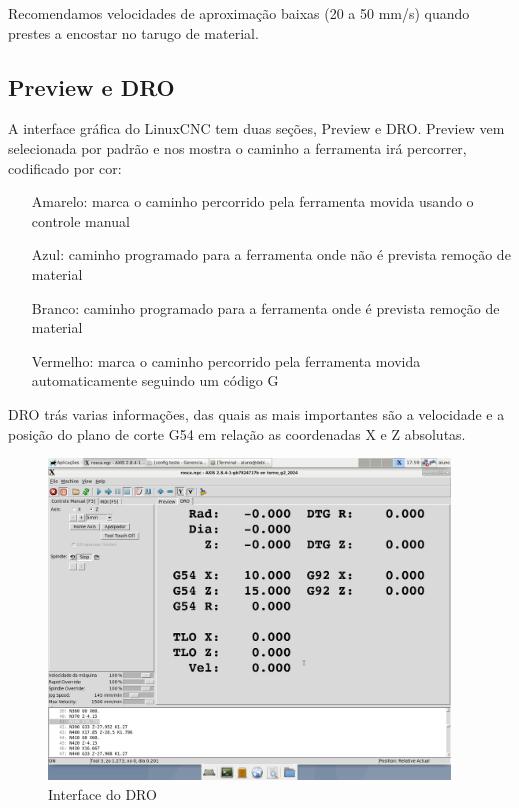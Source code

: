 \documentclass[twoside,a4paper]{refart}
\begin{document}
\attention Recomendamos velocidades de aproximação baixas (20 a 50 mm/s) quando prestes a encostar no tarugo de material.

\subsection{Preview e DRO}

A interface gráfica do LinuxCNC tem duas seções, Preview e DRO. Preview vem selecionada por padrão e nos mostra o caminho a ferramenta irá percorrer, codificado por cor:

\begin{itemize}
    \item[Amarelo:] marca o caminho percorrido pela ferramenta movida usando o controle manual
    \item[Azul:] caminho programado para a ferramenta onde não é prevista remoção de material
    \item[Branco:] caminho programado para a ferramenta onde é prevista remoção de material
    \item[Vermelho:] marca o caminho percorrido pela ferramenta movida automaticamente seguindo um código G
\end{itemize}

DRO trás varias informações, das quais as mais importantes são a velocidade e a posição do plano de corte G54 em relação as coordenadas X e Z absolutas.

\begin{figure}[H]
    \begin{center}
        \includegraphics[width=0.95\textwidth]{imagens/configuracao_de_posicao.png}
    \end{center}
    \caption{Interface do DRO}\label{pos}
\end{figure}
\end{document}
